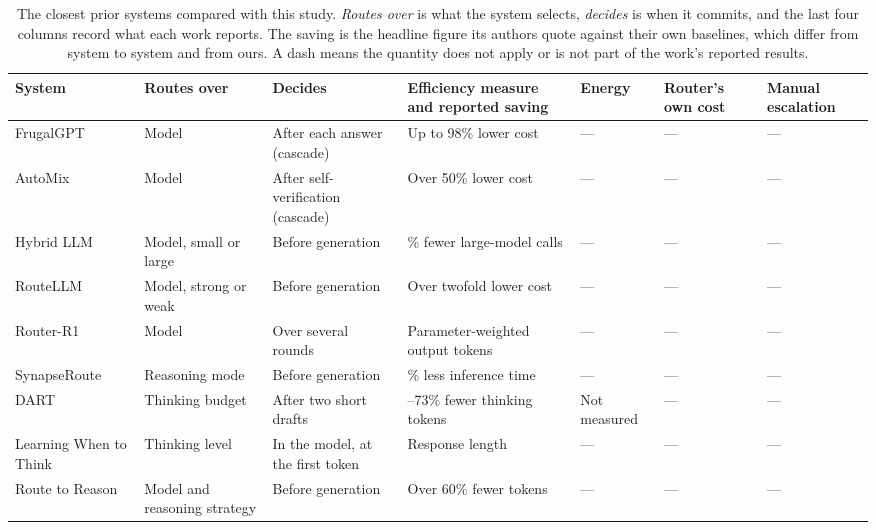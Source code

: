 \begin{table}[ht]
\centering
\footnotesize
\caption{The closest prior systems compared with this study. \emph{Routes
over} is what the system selects, \emph{decides} is when it commits, and the
last four columns record what each work reports. The saving is the headline
figure its authors quote against their own baselines, which differ from
system to system and from ours. A dash means the quantity does not apply or
is not part of the work's reported results.}
\label{tab:prior-work}
\renewcommand{\arraystretch}{1.15}
\setlength{\tabcolsep}{4pt}
\begin{tabularx}{\textwidth}{@{}l >{\raggedright\arraybackslash}p{2.35cm} >{\raggedright\arraybackslash}p{2.35cm} >{\raggedright\arraybackslash}X >{\raggedright\arraybackslash}p{1.85cm} >{\raggedright\arraybackslash}p{2.75cm} >{\raggedright\arraybackslash}p{1.6cm}@{}}
\toprule
System & Routes over & Decides & Efficiency measure and reported saving & Energy & Router's own cost & Manual escalation \\
\midrule
FrugalGPT \cite{chen2023frugalgpt} & Model & After each answer (cascade) & Up to 98\% lower cost & --- & --- & --- \\
AutoMix \cite{aggarwal2024automix} & Model & After self-verification (cascade) & Over 50\% lower cost & --- & --- & --- \\
Hybrid LLM \cite{ding2024hybridllm} & Model, small or large & Before generation & 40\% fewer large-model calls & --- & --- & --- \\
RouteLLM \cite{ong2024routellm} & Model, strong or weak & Before generation & Over twofold lower cost & --- & --- & --- \\
Router-R1 \cite{zhang2025routerr1} & Model & Over several rounds & Parameter-weighted output tokens & --- & --- & --- \\
SynapseRoute \cite{zhang2025synapseroute} & Reasoning mode & Before generation & 36.8\% less inference time & --- & --- & --- \\
DART \cite{lee2026dart} & Thinking budget & After two short drafts & 32--73\% fewer thinking tokens & Not measured & --- & --- \\
Learning When to Think \cite{kassenaar2026learningwhentothink} & Thinking level & In the model, at the first token & Response length & --- & --- & --- \\
Route to Reason \cite{pan2026routetoreason} & Model and reasoning strategy & Before generation & Over 60\% fewer tokens & --- & --- & --- \\

\end{tabularx}
\end{table}
